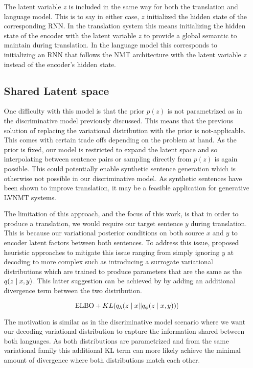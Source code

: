 The latent variable $z$ is included in the same way for both the translation and language model. This is to say in either case, $z$ initialized the hidden state of the corresponding \ac{RNN}. In the translation system this means initializing the hidden state of the encoder with the latent variable $z$ to provide a global semantic to maintain during translation. In the language model this corresponds to initializing an \ac{RNN} that follows the \ac{NMT} architecture with the latent variable $z$ instead of the encoder's hidden state. 


\subsection{Shared Latent space} 

One difficulty with this model is that the prior $p(z)$ is not parametrized as in the discriminative model previously discussed. This means that the previous solution of replacing the variational distribution with the prior is not-applicable. This comes with certain trade offs depending on the problem at hand.
As the prior is fixed, our model is restricted to expand the latent space and so interpolating between sentence pairs or sampling directly from $p(z)$ is again possible. This could potentially enable synthetic sentence generation which is otherwise not possible in our discriminative model. As synthetic sentences have been shown to improve translation, it may be a feasible application for generative \ac{LVNMT} systems. 

The limitation of this approach, and the focus of this work, is that in order to produce a translation, we would require our target sentence $y$ during translation. This is because our variational posterior conditions on both source $x$ and $y$ to encoder latent factors between both sentences. To address this issue, \citet{eikema2018AEVNMT} proposed heuristic approaches to mitigate this issue ranging from simply ignoring $y$ at decoding to more complex such as introducing a surrogate variational distributions which are trained to produce parameters that are the same as the $q(z \; | \;{x, y})$. This latter suggestion can be achieved by by adding an additional divergence term between the two distribution. 

\begin{equation}
\text{ELBO} + KL( q_{\lambda} (z \; | \;{x} || q_{\phi}(z \; | \;{x, y})))
\end{equation}

The motivation is similar as in the discriminative model scenario where we want our decoding variational distribution to capture the information shared between both languages. As both distributions are parametrized and from the same variational family this additional KL term can more likely achieve the minimal amount of divergence where both distributions match each other. 

